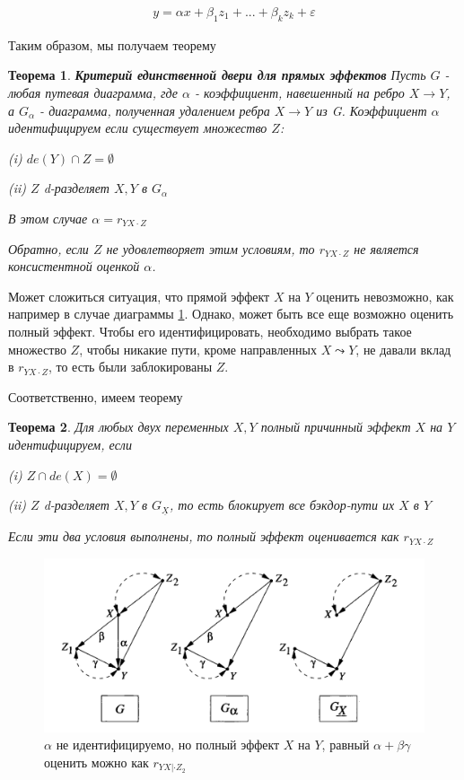 \documentclass[fleqn]{article}
\newtheorem{theorem}{Теорема}
\numberwithin{equation}{section}
\numberwithin{theorem}{section}
\numberwithin{figure}{section}
\numberwithin{lemma}{section}
\numberwithin{corollary}{section}
\begin{document}
\begin{align}
	y = \alpha x + \beta_1z_1 + ... + \beta_kz_k + \varepsilon
\end{align}

Таким образом, мы получаем теорему

\begin{theorem}
	 \textbf{Критерий единственной двери для прямых эффектов} Пусть $G$ - любая путевая диаграмма, где $\alpha$ - коэффициент, навешенный на ребро $X \to Y$, а $G_\alpha$ - диаграмма, полученная удалением ребра $X\to Y$ из G. Коэффициент $\alpha$ идентифицируем если существует множество $Z$:
	 
	 (i) $de(Y) \cap Z = \emptyset$
	 
	 (ii) $Z$ d-разделяет $X,Y$ в $G_\alpha$
	 
	 В этом случае $\alpha = r_{YX\cdot Z}$
	 
	 Обратно, если $Z$ не удовлетворяет этим условиям, то $r_{YX\cdot Z}$ не является консистентной оценкой $\alpha$.
\end{theorem}

Может сложиться ситуация, что прямой эффект $X$ на $Y$ оценить невозможно, как например в случае диаграммы \ref{fig:total_effect}. Однако, может быть все еще возможно оценить полный эффект. Чтобы его идентифицировать, необходимо выбрать такое множество $Z$, чтобы никакие пути, кроме направленных  $X \leadsto Y$, не давали вклад в $r_{YX\cdot Z}$, то есть были заблокированы $Z$.

 Соответственно, имеем теорему 
 
 \begin{theorem}
 	Для любых двух переменных $X,Y$ полный причинный эффект $X$ на $Y$ идентифицируем, если 
 	
 	(i) $Z \cap de(X) = \emptyset$
 	
 	(ii) $Z$ d-разделяет $X,Y$ в $G_{\underline X}$, то есть блокирует все бэкдор-пути их $X$ в $Y$
 	
 	Если эти два условия выполнены, то полный эффект оценивается как $r_{YX \cdot Z}$
 \end{theorem}

\begin{figure}[h]
	\begin{center}
		\includegraphics[scale=0.6]{imgs/img32.png}
	\end{center}
	\caption{$\alpha$ не идентифицируемо, но полный эффект $X$ на $Y$, равный $\alpha + \beta \gamma $ оценить можно как $r_{YX|\cdot Z_2}$}
	\label{fig:total_effect}
\end{figure}
\end{document}
